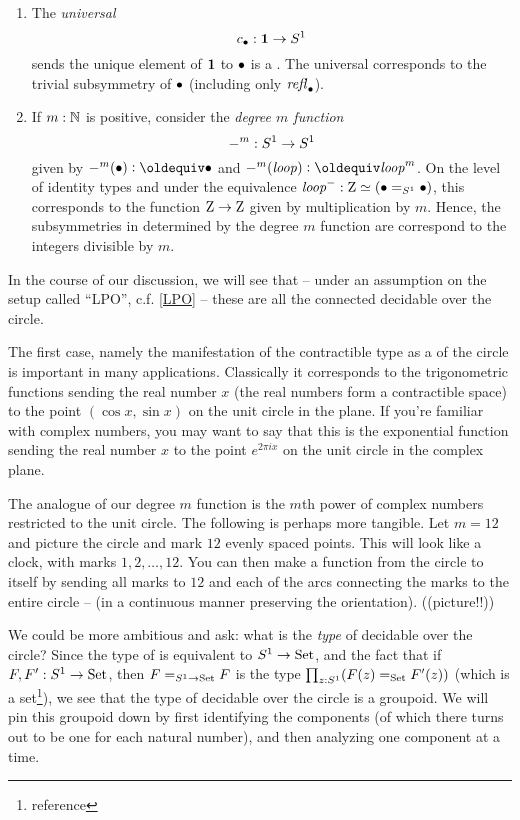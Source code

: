 \begin{example}
  \label{ex:listofS1covers}
  \begin{enumerate}
  \item The \emph{universal} \covering  $$c_\bullet:\mathbf{1}\to S^1$$ sends the unique element of $\mathbf{1}$ to $\bullet$ is a \covering. The universal \covering corresponds to the trivial subsymmetry of $\bullet$ (\ie including only $\mathop{{\it refl}_{\bullet}}$).  
  \item If $m:\mathbb{N}$ is positive, consider the \emph{degree $m$ function} $$-^m:S^1\to S^1$$ given by $-^m(\base)\defequi\base$ and $-^m(\Sloop)\defequi\Sloop^m$.  On the level of identity types and under the equivalence $\mathit{loop}^-:\mathrm{Z}\simeq(\bullet=_{S^1}\bullet)$, this \covering corresponds to the function $\mathrm{Z}\to\mathrm{Z}$ given by multiplication by $m$.  Hence, the subsymmetries in determined by the degree $m$ function are correspond to the integers divisible by $m$.
  \end{enumerate}
  In the course of our discussion, we will see that -- under an assumption on the setup called ``LPO'', c.f. \cref{LPO} -- these are all the connected decidable \coverings over the circle.
\end{example}

\begin{remark}
  \label{rem:RtoS1}
  The first case, namely the manifestation of the contractible type as a \covering of the circle is important in many applications.  Classically it corresponds to the trigonometric functions sending the real number $x$ (the real numbers form a contractible space) to the point $(\cos x,\sin x)$ on the unit circle in the plane.  If you're familiar with complex numbers, you may want to say that this \covering is the exponential function sending the real number $x$ to the point $e^{2\pi ix}$ on the unit circle in the complex plane.

  \label{rem:finitecoveringsofS1}
  The analogue of our degree $m$ function is the $m$th power of complex numbers restricted to the unit circle.  The following is perhaps more tangible.  Let $m=12$ and picture the circle and mark $12$ evenly spaced points.  This will look like a clock, with marks $1,2,\dots,12$.  You can then make a function from the circle to itself by sending all marks to $12$ and each of the arcs connecting the marks to the entire circle -- (in a continuous manner preserving the orientation).
  ((picture!!))
\end{remark}

We could be more ambitious and ask: what is the \emph{type} of decidable \coverings over the circle?  Since the type of \coverings is equivalent to $S^1\to \mathord{\mathrm{Set}}$, and the fact that if $F,F':S^1\to\mathord{\mathrm{Set}}$, then $F=_{S^1\to\mathord{\mathrm{Set}}}F$ is the type $\prod_{z:S^1}(F(z)=_{\mathord{\mathrm{Set}}}F'(z))$ (which is a set\footnote{reference}), we see that the type of decidable \coverings over the circle is a groupoid.  We will pin this groupoid down by first identifying the components (of which there turns out to be one for each natural number), and then analyzing one component at a time.


